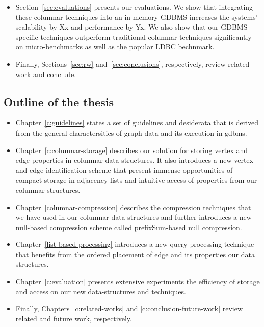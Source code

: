 \begin{itemize}
	\item Section~\ref{sec:evaluations} presents our evaluations. We show that integrating these columnar techniques into an in-memory GDBMS increases the systems' scalability by Xx and performance by Yx. We also show that our GDBMS-specific techniques outperform traditional columnar techniques significantly on micro-benchmarks as well as the popular LDBC bechnmark.
	
	\item Finally, Sections~\ref{sec:rw} and~\ref{sec:conclusions}, respectively, review related work and conclude.   
\end{itemize}


\subsection{Outline of the thesis}

\begin{itemize}
	\item Chapter~\ref{c:guidelines} states a set of guidelines and desiderata that is derived from the general charactersitics of graph data and its execution in \gls{gdbms}.
	\item Chapter~\ref{c:columnar-storage} describes our solution for storing vertex and edge properties in columnar data-structures. It also introduces a new vertex and edge identification scheme that present immense opportunities of compact storage in adjacency lists and intuitive access of properties from our columnar structures.
	\item Chapter~\ref{columnar-compression} describes the compression techniques that we have used in our columnar data-structures and further introduces a new null-based compression scheme called prefixSum-based null compression.
	\item Chapter~\ref{list-based-processing} introduces a new query processing technique that benefits from the ordered placement of edge and its properties our data structures.
	\item Chapter~\ref{c:evaluation} presents extensive experiments the efficiency of storage and access on our new data-structures and techniques.
	\item Finally, Chapters~\ref{c:related-works} and \ref{c:conclusion-future-work} review related and future work, respectively.
 \end{itemize}
